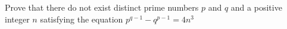Prove that there do not exist distinct prime numbers $p$ and $q$ and a positive integer $n$ satisfying the equation $p^{q-1}- q^{p-1}=4n^3$